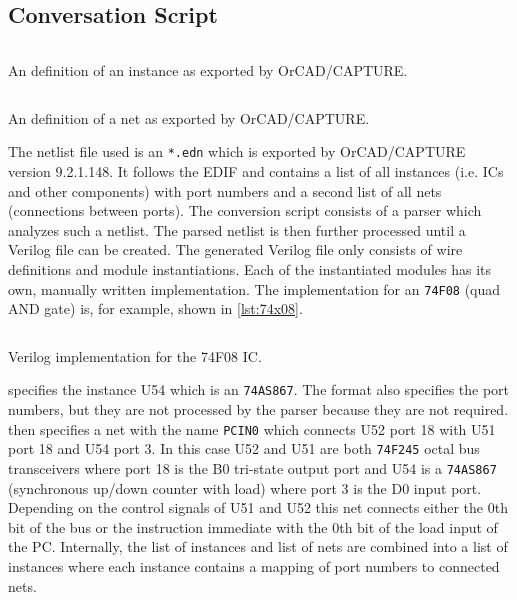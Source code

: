\subsection{Conversation Script}
\begin{listing}
  \inputminted[linenos,
    breaklines,
    frame=leftline,
    xleftmargin=20pt,
  ]{clojure}{src/edifInstance.edn}
  \caption{An  definition of an instance as exported by OrCAD/CAPTURE.}
  \label{lst:edifInstance}
\end{listing}
\begin{listing}
  \inputminted[linenos,
    breaklines,
    frame=leftline,
    xleftmargin=20pt,
  ]{clojure}{src/edifNet.edn}
  \caption{An  definition of a net as exported by OrCAD/CAPTURE.}
  \label{lst:edifNet}
\end{listing}
The netlist file used is an \texttt{*.edn} which is exported by OrCAD/CAPTURE version 9.2.1.148.
It follows the \gls{EDIF} and contains a list of all instances (i.e. \glspl{IC} and other components) with port numbers and a second list of all nets (connections between ports).
The conversion script consists of a parser which analyzes such a netlist.
The parsed netlist is then further processed until a Verilog file can be created.
The generated Verilog file only consists of wire definitions and module instantiations.
Each of the instantiated modules has its own, manually written implementation.
The implementation for an \texttt{74F08} (quad AND gate) is, for example, shown in \cref{lst:74x08}.
\begin{listing}[t]
  \inputminted[linenos,
    breaklines,
    frame=leftline,
    xleftmargin=20pt,
  ]{Verilog}{src/ic74x08.v}
  \caption{Verilog implementation for the 74F08 \gls{IC}.}
  \label{lst:74x08}
\end{listing}

 specifies the instance U54 which is an \texttt{74AS867}.
The format also specifies the port numbers, but they are not processed by the parser because they are not required.
 then specifies a net with the name \texttt{PCIN0} which connects U52 port 18 with U51 port 18 and U54 port 3.
In this case U52 and U51 are both \texttt{74F245} octal bus transceivers where port 18 is the B0 tri-state output port and U54 is a \texttt{74AS867} (synchronous up/down counter with load) where port 3 is the D0 input port.
Depending on the control signals of U51 and U52 this net connects either the 0th bit of the bus or the instruction immediate with the 0th bit of the load input of the \gls{PC}.
Internally, the list of instances and list of nets are combined into a list of instances where each instance contains a mapping of port numbers to connected nets.

